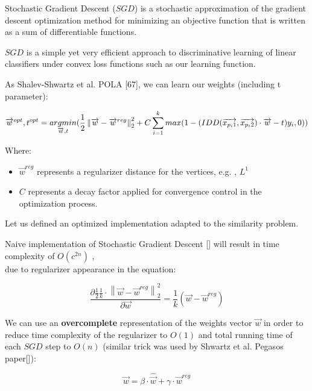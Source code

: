 Stochastic Gradient Descent ($SGD$) is a stochastic approximation of the gradient descent optimization method for minimizing an objective function that is written as a sum of differentiable functions.

$SGD$ is a simple yet very efficient approach to discriminative learning of linear classifiers under convex loss functions such as our learning function.

As Shalev-Shwartz et al. POLA [67], we can learn our weights (including t parameter):

\begin{equation}
\overrightarrow{w}^{opt} , t^{opt} =\\ 
\underset{\overrightarrow{w} , t}{argmin} (\frac{1}{2}\left \| \overrightarrow{w} - \overrightarrow{w}^{reg} \right \|_2^2 + C \sum_{i=1}^{k}max(1-(IDD(\overrightarrow{x_{p_i1}} , \overrightarrow{x_{p_i2}}) \cdot \overrightarrow{w} - t)y_i , 0)) \end{equation}



Where:
\begin{itemize}
		\item $\overrightarrow{w}^{reg}$ represents a regularizer distance for the vertices, e.g. , $L^1$
	\item $C$ represents a decay factor applied for convergence control in the optimization process.
\end{itemize}

Let us defined an optimized implementation adapted to the similarity problem.

Naive implementation of Stochastic Gradient Descent [] will result in time complexity of $O(c^{2n})$  , \\
due to regularizer appearance in the equation: 


\begin{equation}
\frac{\partial\frac{1}{2}\frac{1}{k}\cdot
	\left \|\overrightarrow{w} - \overrightarrow{w}^{reg}  \right \|_{2}^{2}
}{\partial \overrightarrow{w}}  = \frac{1}{k}(\overrightarrow{w} -  \overrightarrow{w}^{reg})
\end{equation}

We can use an \textbf{overcomplete} representation of the weights vector $\overrightarrow{w}$ in order to reduce time complexity of the regularizer to $O(1)$ and total running time of each $SGD$ step to $O(n)$ (similar trick was used by Shwartz et al. Pegasos paper[]):

\begin{equation}
\overrightarrow{w} = \beta\cdot\hat{\overrightarrow{w}} + \gamma \cdot \overrightarrow{w}^{reg}
\end{equation}

